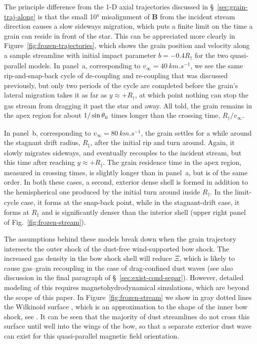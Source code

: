 The principle difference from the 1-D axial trajectories discussed in
\S~\ref{sec:grain-traj-along} is that the small \ang{10} misalignment
of \(\bm{B}\) from the incident stream direction causes a slow
sideways migration, which puts a finite limit on the time a grain can
reside in front of the star.  This can be appreciated more clearly in
Figure~\ref{fig:frozen-trajectories}, which shows the grain position
and velocity along a sample streamline with initial impact parameter
\(b = -0.4 R_\dag\) for the two quasi-parallel models.  In panel~a,
corresponding to \(v_\infty = \SI{40}{km.s^{-1}}\), we see the same
rip-and-snap-back cycle of de-coupling and re-coupling that was
discussed previously, but only two periods of the cycle are completed
before the grain's lateral migration takes it as far as
\(y \approx +R_\dag\), at which point nothing can stop the gas stream from
dragging it past the star and away.  All told, the grain remains in
the apex region for about \(1/\sin\theta_{\scriptscriptstyle\text{B}}\) times longer than the crossing
time, \(R_\dag / v_\infty\).

In panel~b, corresponding to \(v_\infty = \SI{80}{km.s^{-1}}\), the grain
settles for a while around the stagnant drift radius, \(R_\ddag\), after
the initial rip and turn around.  Again, it slowly migrates sideways,
and eventually recouples to the incident stream, but this time after
reaching \(y \approx +R_\ddag\).  The grain residence time in the apex region,
measured in crossing times, is slightly longer than in panel~a, but is
of the same order.  In both these cases, a second, exterior dense
shell is formed in addition to the hemispherical one produced by the
initial turn around inside \(R_\dag\). In the limit-cycle case, it forms
at the snap-back point, while in the stagnant-drift case, it forms at
\(R_\ddag\) and is significantly denser than the interior shell (upper
right panel of Fig.~\ref{fig:frozen-stream}).

The assumptions behind these models break down when the grain
trajectory intersects the outer shock of the dust-free wind-supported
bow shock.  The increased gas density in the bow shock shell will
reduce \(\Xi\), which is likely to cause gas--grain recoupling in the
case of drag-confined dust waves (see also discussion in the final
paragraph of \S~\ref{sec:exist-cond-separ}).  However, detailed
modeling of this requires magnetohydrodynamical simulations, which are
beyond the scope of this paper.  In Figure~\ref{fig:frozen-stream} we
show in gray dotted lines the Wilkinoid surface \citep{Wilkin:1996a},
which is an approximation to the shape of the inner bow shock, see
\PaperI.  It can be seen that the majority of dust streamlines do not
cross this surface until well into the wings of the bow, so that a
separate exterior dust wave can exist for this quasi-parallel
magnetic field orientation.

